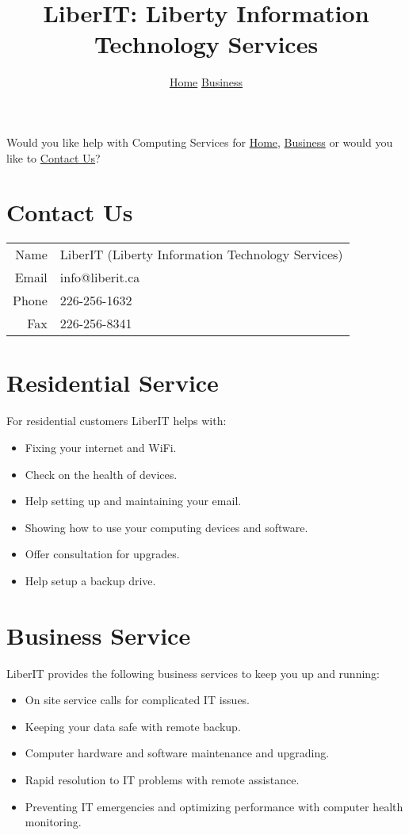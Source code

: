 \documentclass[12pt]{article}
\title{LiberIT: Liberty Information Technology Services}
\author{ \hyperref[residential]{Home}
  \hyperref[business]{Business} }
\begin{document}
\maketitle

Would you like help with Computing Services for
  \hyperref[residential]{Home}, \hyperref[business]{Business}
or would you like to 
   \hyperref[contact]{Contact Us}?

\tableofcontents
\section{Contact Us}\label{contact}
\begin{tabulary}{\pagewidth}{rl}
  Name & LiberIT (Liberty Information Technology Services) \\ 
  Email & info@liberit.ca \\
  Phone & 226-256-1632 \\
  Fax & 226-256-8341 \\
\end{tabulary}
\section{Residential Service}\label{residential}

For residential customers LiberIT helps with:

\begin{itemize}
  \item Fixing your internet and WiFi. 
  \item Check on the health of devices. 
  \item Help setting up and maintaining your email.
  \item Showing how to use your computing devices and software. 
  \item Offer consultation for upgrades.
  \item Help setup a backup drive. 
\end{itemize}

\section{Business Service}\label{business}

LiberIT provides the following business services to keep you up and running:

\begin{itemize}
  \item On site service calls for complicated IT issues. 
  \item Keeping your data safe with remote backup. 
  \item Computer hardware and software maintenance and upgrading. 
  \item Rapid resolution to IT problems with remote assistance. 
  \item Preventing IT emergencies and optimizing performance with computer
    health monitoring. 
\end{itemize}
\end{document}
